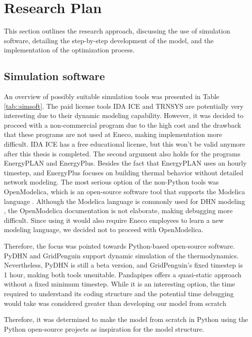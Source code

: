 \section{Research Plan}
This section outlines the research approach, discussing the use of simulation software, detailing the step-by-step development of the model, and the implementation of the optimization process.

\subsection{Simulation software}\label{sec::SimulationModel}
An overview of possibly suitable simulation tools was presented in Table \ref{tab::simsoft}. The paid license tools IDA ICE and TRNSYS are potentially very interesting due to their dynamic modeling capability. However, it was decided to proceed with a non-commercial program due to the high cost and the drawback that these programs are not used at Eneco, making implementation more difficult. IDA ICE has a free educational license, but this won't be valid anymore after this thesis is completed. The second argument also holds for the programs EnergyPLAN and EnergyPlus. Besides the fact that EnergyPLAN uses an hourly timestep, and EnergyPlus focuses on building thermal behavior without detailed network modeling. The most serious option of the non-Python tools was OpenModelica, which is an open-source software tool that supports the Modelica language \cite{Modelica}. Although the Modelica language is commonly used for DHN modeling \cite{KUNTUAROVA}, the OpenModelica documentation is not elaborate, making debugging more difficult. Since using it would also require Eneco employees to learn a new modeling language, we decided not to proceed with OpenModelica.

Therefore, the focus was pointed towards Python-based open-source software. PyDHN and GridPenguin support dynamic simulation of the thermodynamics. Nevertheless, PyDHN is still a beta version, and GridPenguin's fixed timestep is 1 hour, making both tools unsuitable. Pandapipes offers a quasi-static approach without a fixed minimum timestep. While it is an interesting option, the time required to understand its coding structure and the potential time debugging would take was considered greater than developing our model from scratch

Therefore, it was determined to make the model from scratch in Python using the Python open-source projects as inspiration for the model structure.

